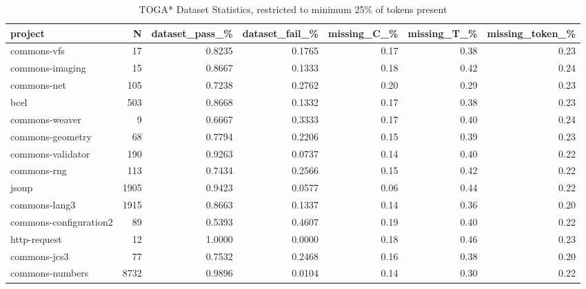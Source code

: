 \begin{table*}
\centering
\caption{TOGA* Dataset Statistics, restricted to minimum 25\% of tokens present}
\label{tab:toga_stats_25}
\begin{tabular}{lrrrrrr}
\toprule
                project &      N &  dataset\_pass\_\% &  dataset\_fail\_\% &  missing\_C\_\% &  missing\_T\_\% &  missing\_token\_\% \\
\midrule
            commons-vfs &     17 &          0.8235 &          0.1765 &         0.17 &         0.38 &             0.23 \\
        commons-imaging &     15 &          0.8667 &          0.1333 &         0.18 &         0.42 &             0.24 \\
            commons-net &    105 &          0.7238 &          0.2762 &         0.20 &         0.29 &             0.23 \\
                   bcel &    503 &          0.8668 &          0.1332 &         0.17 &         0.38 &             0.23 \\
         commons-weaver &      9 &          0.6667 &          0.3333 &         0.17 &         0.40 &             0.24 \\
       commons-geometry &     68 &          0.7794 &          0.2206 &         0.15 &         0.39 &             0.23 \\
      commons-validator &    190 &          0.9263 &          0.0737 &         0.14 &         0.40 &             0.22 \\
            commons-rng &    113 &          0.7434 &          0.2566 &         0.15 &         0.42 &             0.22 \\
                  jsoup &   1905 &          0.9423 &          0.0577 &         0.06 &         0.44 &             0.22 \\
          commons-lang3 &   1915 &          0.8663 &          0.1337 &         0.14 &         0.36 &             0.20 \\
 commons-configuration2 &     89 &          0.5393 &          0.4607 &         0.19 &         0.40 &             0.22 \\
           http-request &     12 &          1.0000 &          0.0000 &         0.18 &         0.46 &             0.23 \\
           commons-jcs3 &     77 &          0.7532 &          0.2468 &         0.16 &         0.38 &             0.20 \\
        commons-numbers &   8732 &          0.9896 &          0.0104 &         0.14 &         0.30 &             0.22 \\

\end{tabular}
\end{table*}
